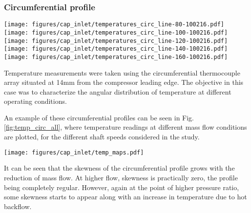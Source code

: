 \subsubsection{Circumferential profile}

\begin{figure*}[htb!]
\centering
\texttt{[image: figures/cap\_inlet/temperatures\_circ\_line-80-100216.pdf]}
\texttt{[image: figures/cap\_inlet/temperatures\_circ\_line-100-100216.pdf]}
\texttt{[image: figures/cap\_inlet/temperatures\_circ\_line-120-100216.pdf]}
\texttt{[image: figures/cap\_inlet/temperatures\_circ\_line-140-100216.pdf]}
\texttt{[image: figures/cap\_inlet/temperatures\_circ\_line-160-100216.pdf]}
\caption{Evolution of temperature measured by the circumferential array thermocouples as air mass flow was reduced keeping shaft speed constant. A polar temperature plot is shown for each speed, colors indicating mass flow from higher (blues) to lower (reds). Legends for colors at each speed are available in Fig. \ref{fig:temp_line_linear}. See Fig. \ref{fig:metod_local_meas_dimen} for reference position of the compressor volute.}
\label{fig:temp_circ_all}
\end{figure*}

Temperature measurements were taken using the circumferential thermocouple array situated at 14mm from the compressor leading edge. The objective in this case was to characterize the angular distribution of temperature at different operating conditions.

An example of these circumferential profiles can be seen in Fig. \ref{fig:temp_circ_all}, where temperature readings at different mass flow conditions are plotted, for the different shaft speeds considered in the study. 

\begin{figure*}[htb!]
\centering
\texttt{[image: figures/cap\_inlet/temp\_maps.pdf]}
\caption{\hl{Evolution of temperature rise measured by the linear array thermocouples for different mass flow settings at 140 krpm, taking the most upstream temperature as reference.}}
\label{fig:temp_maps}
\end{figure*}

It can be seen that the skewness of the circumferential profile grows with the reduction of mass flow. At higher flow, skewness is practically zero, the profile being completely regular. However, again at the point of higher pressure ratio, some skewness starts to appear along with an increase in temperature due to hot backflow.

